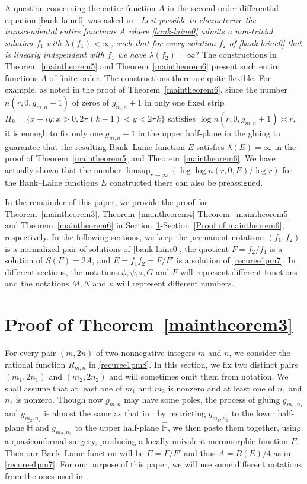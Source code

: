 \documentclass[12pt]{amsart}
\numberwithin{equation}{section}
\begin{document}
A question concerning the entire function $A$ in the second order differential equation \eqref{bank-laine0} was asked in \cite[Question~4.5]{Gundersen2017}: \emph{Is it possible to characterize the transcendental entire functions $A$ where \eqref{bank-laine0} admits a non-trivial solution $f_1$ with $\lambda(f_1)<\infty$, such that for every solution $f_2$ of \eqref{bank-laine0} that is linearly independent with $f_1$ we have $\lambda(f_2)=\infty$}? The constructions in Theorem~\ref{maintheorem5} and Theorem~\ref{maintheorem6} present such entire functions $A$ of finite order. The constructions there are quite flexible. For example, as noted in the proof of Theorem~\ref{maintheorem6}, since the number $n(\dot{r},0,g_{m,n}+1)$ of zeros of $g_{m,n}+1$ in only one fixed strip $\Pi_k=\{x+iy: x>0, 2\pi(k-1)<y<2\pi k\}$ satisfies $\log n(\dot{r},0,g_{m,n}+1)\asymp r$, it is enough to fix only one $g_{m,n}+1$ in the upper half-plane in the gluing to guarantee that the resulting Bank--Laine function $E$ satisfies $\lambda(E)=\infty$ in the proof of Theorem~\ref{maintheorem5} and Theorem~\ref{maintheorem6}. We have actually shown that the number $\limsup_{r\to\infty}(\log\log n(r,0,E)/\log r)$ for the Bank--Laine functions $E$ constructed there can also be preassigned.


In the remainder of this paper, we provide the proof for Theorem~\ref{maintheorem3}, Theorem~\ref{maintheorem4} Theorem~\ref{maintheorem5} and Theorem~\ref{maintheorem6} in Section~\ref{Proof of maintheorem3}-Section~\ref{Proof of maintheorem6}, respectively. In the following sections, we keep the permanent notation: $(f_1,f_2)$ is a normalized pair of solutions of \eqref{bank-laine0}, the quotient $F=f_2/f_1$ is a solution of $S(F)=2A$, and $E=f_1f_2=F/F'$ is a solution of \eqref{recuree1pm7}. In different sections, the notations $\phi,\psi,\tau,G$ and $F$ will represent different functions and the notations $M,N$ and $\kappa$ will represent different numbers.

\section{Proof of Theorem~\ref{maintheorem3}}\label{Proof of maintheorem3} %

For every pair $(m,2n)$ of two nonnegative integers $m$ and $n$, we consider the rational function $R_{m,n}$ in \eqref{recuree1pm8}. In this section, we fix two distinct pairs $(m_1,2n_1)$ and $(m_2,2n_2)$ and will sometimes omit them from notation. We shall assume that at least one of $m_1$ and $m_2$ is nonzero and at least one of $n_1$ and $n_2$ is nonzero. Though now $g_{m,n}$ may have some poles, the process of gluing $g_{m_1,n_1}$ and $g_{m_2,n_2}$ is almost the same as that in \cite{Bergweilereremenko2017}: by restricting $g_{m_1,n_1}$ to the lower half-plane $\check{\mathbb{H}}$ and $g_{m_2,n_2}$ to the upper half-plane $\hat{\mathbb{H}}$, we then paste them together, using a quasiconformal surgery, producing a locally univalent meromorphic function $F$. Then our Bank--Laine function will be $E=F/F'$ and thus $A=B(E)/4$ as in \eqref{recuree1pm7}. For our purpose of this paper, we will use some different notations from the ones used in \cite{Bergweilereremenko2017}.
\end{document}
